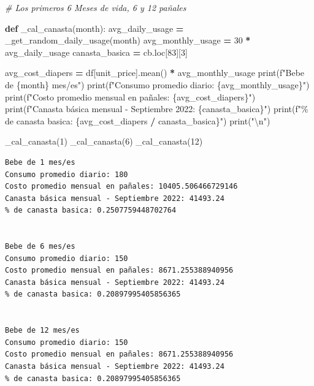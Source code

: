 \documentclass[
]{article}
\newenvironment{Shaded}{\begin{snugshade}}{\end{snugshade}}
\newcommand{\BuiltInTok}[1]{#1}
\newcommand{\CharTok}[1]{\textcolor[rgb]{0.31,0.60,0.02}{#1}}
\newcommand{\CommentTok}[1]{\textcolor[rgb]{0.56,0.35,0.01}{\textit{#1}}}
\newcommand{\DecValTok}[1]{\textcolor[rgb]{0.00,0.00,0.81}{#1}}
\newcommand{\KeywordTok}[1]{\textcolor[rgb]{0.13,0.29,0.53}{\textbf{#1}}}
\newcommand{\NormalTok}[1]{#1}
\newcommand{\OperatorTok}[1]{\textcolor[rgb]{0.81,0.36,0.00}{\textbf{#1}}}
\newcommand{\SpecialCharTok}[1]{\textcolor[rgb]{0.00,0.00,0.00}{#1}}
\newcommand{\SpecialStringTok}[1]{\textcolor[rgb]{0.31,0.60,0.02}{#1}}
\newcommand{\StringTok}[1]{\textcolor[rgb]{0.31,0.60,0.02}{#1}}
\begin{document}
\begin{Shaded}
\begin{Highlighting}[]
\CommentTok{\# Los primeros 6 Meses de vida, 6 y 12 pañales}

\KeywordTok{def}\NormalTok{ \_cal\_canasta(month):}
\NormalTok{    avg\_daily\_usage }\OperatorTok{=}\NormalTok{ \_get\_random\_daily\_usage(month) }
\NormalTok{    avg\_monthly\_usage }\OperatorTok{=} \DecValTok{30} \OperatorTok{*}\NormalTok{ avg\_daily\_usage}
\NormalTok{    canasta\_basica }\OperatorTok{=}\NormalTok{ cb.loc[}\DecValTok{83}\NormalTok{][}\DecValTok{3}\NormalTok{]}

\NormalTok{    avg\_cost\_diapers }\OperatorTok{=}\NormalTok{ df[}\StringTok{\textquotesingle{}unit\_price\textquotesingle{}}\NormalTok{].mean()  }\OperatorTok{*}\NormalTok{ avg\_monthly\_usage}
    \BuiltInTok{print}\NormalTok{(}\SpecialStringTok{f"Bebe de }\SpecialCharTok{\{}\NormalTok{month}\SpecialCharTok{\}}\SpecialStringTok{ mes/es"}\NormalTok{)}
    \BuiltInTok{print}\NormalTok{(}\SpecialStringTok{f"Consumo promedio diario: }\SpecialCharTok{\{}\NormalTok{avg\_monthly\_usage}\SpecialCharTok{\}}\SpecialStringTok{"}\NormalTok{)}
    \BuiltInTok{print}\NormalTok{(}\SpecialStringTok{f"Costo promedio mensual en pañales: }\SpecialCharTok{\{}\NormalTok{avg\_cost\_diapers}\SpecialCharTok{\}}\SpecialStringTok{"}\NormalTok{)}
    \BuiltInTok{print}\NormalTok{(}\SpecialStringTok{f"Canasta básica mensual {-} Septiembre 2022: }\SpecialCharTok{\{}\NormalTok{canasta\_basica}\SpecialCharTok{\}}\SpecialStringTok{"}\NormalTok{)}
    \BuiltInTok{print}\NormalTok{(}\SpecialStringTok{f"\% de canasta basica: }\SpecialCharTok{\{}\NormalTok{avg\_cost\_diapers }\OperatorTok{/}\NormalTok{ canasta\_basica}\SpecialCharTok{\}}\SpecialStringTok{"}\NormalTok{)}
    \BuiltInTok{print}\NormalTok{(}\StringTok{"}\CharTok{\textbackslash{}n}\StringTok{"}\NormalTok{)}
    
\NormalTok{\_cal\_canasta(}\DecValTok{1}\NormalTok{)}
\NormalTok{\_cal\_canasta(}\DecValTok{6}\NormalTok{)}
\NormalTok{\_cal\_canasta(}\DecValTok{12}\NormalTok{)}
\end{Highlighting}
\end{Shaded}

\begin{verbatim}
Bebe de 1 mes/es
Consumo promedio diario: 180
Costo promedio mensual en pañales: 10405.506466729146
Canasta básica mensual - Septiembre 2022: 41493.24
% de canasta basica: 0.2507759448702764


Bebe de 6 mes/es
Consumo promedio diario: 150
Costo promedio mensual en pañales: 8671.255388940956
Canasta básica mensual - Septiembre 2022: 41493.24
% de canasta basica: 0.20897995405856365


Bebe de 12 mes/es
Consumo promedio diario: 150
Costo promedio mensual en pañales: 8671.255388940956
Canasta básica mensual - Septiembre 2022: 41493.24
% de canasta basica: 0.20897995405856365
\end{verbatim}
\end{document}
